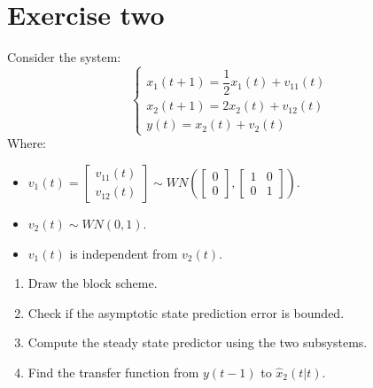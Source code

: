 \section{Exercise two}

Consider the system: 
\[\begin{cases}
    x_1(t+1)=\dfrac{1}{2}x_1(t)+v_{11}(t) \\
    x_2(t+1)=2x_2(t)+v_{12}(t) \\
    y(t)=x_2(t)+v_2(t)
\end{cases}\]
Where: 
\begin{itemize}
    \item $v_1(t)=\begin{bmatrix} v_{11}(t) \\ v_{12}(t) \end{bmatrix} \sim WN\left(\begin{bmatrix} 0 \\ 0 \end{bmatrix},\begin{bmatrix} 1 & 0 \\ 0 & 1 \end{bmatrix}\right)$. 
    \item $v_2(t)\sim WN(0,1)$.
    \item $v_1(t)$ is independent from $v_2(t)$. 
\end{itemize}
\begin{enumerate}
    \item Draw the block scheme. 
    \item Check if the asymptotic state prediction error is bounded.
    \item Compute the steady state predictor using the two subsystems.
    \item Find the transfer function from $y(t-1)$ to $\hat{x}_2(t|t)$. 
\end{enumerate}

